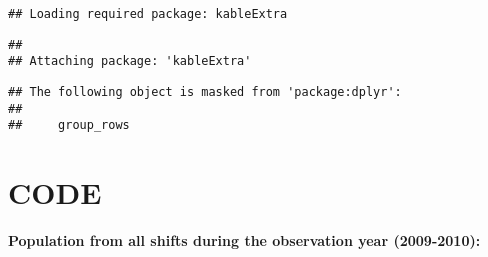 \documentclass[
]{article}
\newenvironment{Shaded}{\begin{snugshade}}{\end{snugshade}}
\newcommand{\AttributeTok}[1]{\textcolor[rgb]{0.77,0.63,0.00}{#1}}
\newcommand{\CommentTok}[1]{\textcolor[rgb]{0.56,0.35,0.01}{\textit{#1}}}
\newcommand{\ConstantTok}[1]{\textcolor[rgb]{0.00,0.00,0.00}{#1}}
\newcommand{\FunctionTok}[1]{\textcolor[rgb]{0.00,0.00,0.00}{#1}}
\newcommand{\NormalTok}[1]{#1}
\newcommand{\OtherTok}[1]{\textcolor[rgb]{0.56,0.35,0.01}{#1}}
\newcommand{\SpecialCharTok}[1]{\textcolor[rgb]{0.00,0.00,0.00}{#1}}
\newcommand{\StringTok}[1]{\textcolor[rgb]{0.31,0.60,0.02}{#1}}
\begin{document}
\begin{verbatim}
## Loading required package: kableExtra
\end{verbatim}

\begin{verbatim}
## 
## Attaching package: 'kableExtra'
\end{verbatim}

\begin{verbatim}
## The following object is masked from 'package:dplyr':
## 
##     group_rows
\end{verbatim}

\begin{Shaded}
\end{Shaded}

\hypertarget{code}{%
\section{CODE}\label{code}}

\textbf{Population from all shifts during the observation year
(2009-2010):}
\end{document}
